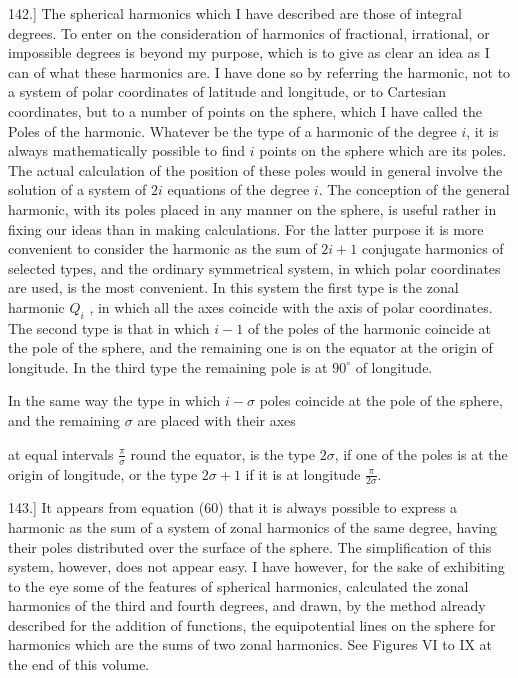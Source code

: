 \documentclass[11pt,a4paper]{article}
\begin{document}
142.] The spherical harmonics which I have described are those of integral degrees. To enter on the consideration of harmonics of fractional, irrational, or impossible degrees is beyond my purpose, which is to give as clear an idea as I can of what these harmonics are. I have done so by referring the harmonic, not to a system of polar coordinates of latitude and longitude, or to Cartesian coordinates, but to a number of points on the sphere, which I have called the Poles of the harmonic. Whatever be the type of a harmonic of the degree $i$, it is always mathematically possible to find $i$ points on the sphere which are its poles. The actual calculation of the position of these poles would in general involve the solution of a system of $2i$ equations of the degree $i$. The conception of the general harmonic, with its poles placed in any manner on the sphere, is useful rather in fixing our ideas than in making calculations. For the latter purpose it is more convenient to consider the harmonic as the sum of $2i+1$ conjugate harmonics of selected types, and the ordinary symmetrical system, in which polar coordinates are used, is the most convenient. In this system the first type is the zonal harmonic  $Q_i$ , in which all the axes coincide with the axis of polar coordinates. The second type is that in which $i-1$ of the poles of the harmonic coincide at the pole of the sphere, and the remaining one is on the equator at the origin of longitude. In the third type the remaining pole is at $90^\circ$ of longitude.

In the same way the type in which  $i-\sigma$  poles coincide at the pole of the sphere, and the remaining  $\sigma$  are placed with their axes

at equal intervals $\frac{\pi}{\sigma}$ round the equator, is the type $2\sigma$, if one of the poles is at the origin of longitude, or the type $2\sigma+1$ if it is at longitude $\frac{\pi}{2\sigma}$.

143.] It appears from equation (60) that it is always possible to express a harmonic as the sum of a system of zonal harmonics of the same degree, having their poles distributed over the surface of the sphere. The simplification of this system, however, does not appear easy. I have however, for the sake of exhibiting to the eye some of the features of spherical harmonics, calculated the zonal harmonics of the third and fourth degrees, and drawn, by the method already described for the addition of functions, the equipotential lines on the sphere for harmonics which are the sums of two zonal harmonics. See Figures VI to IX at the end of this volume.
\end{document}
